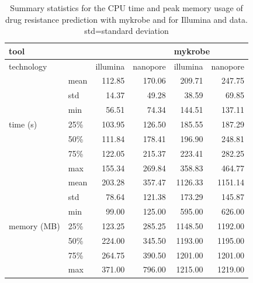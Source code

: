 \begin{table}
\centering
\begin{tabular}{|l|l|r|r|r|r|}
\hline
\multicolumn{2}{|l|}{tool}       & \multicolumn{2}{l|}{\drprg{}} & \multicolumn{2}{l|}{mykrobe} \\ \hline
\multicolumn{2}{|l|}{technology} & illumina     & nanopore    & illumina      & nanopore     \\ \hline
\multirow{7}{*}{time (s)}    & mean  & 112.85       & 170.06      & 209.71        & 247.75       \\ \cline{2-6} 
                         & std   & 14.37        & 49.28       & 38.59         & 69.85        \\ \cline{2-6} 
                         & min   & 56.51        & 74.34       & 144.51        & 137.11       \\ \cline{2-6} 
                         & 25\%  & 103.95       & 126.50      & 185.55        & 187.29       \\ \cline{2-6} 
                         & 50\%  & 111.84       & 178.41      & 196.90        & 248.81       \\ \cline{2-6} 
                         & 75\%  & 122.05       & 215.37      & 223.41        & 282.25       \\ \cline{2-6} 
                         & max   & 155.34       & 269.84      & 358.83        & 464.77       \\ \hline
\multirow{7}{*}{memory (MB)}  & mean  & 203.28       & 357.47      & 1126.33       & 1151.14      \\ \cline{2-6} 
                         & std   & 78.64        & 121.38      & 173.29        & 145.87       \\ \cline{2-6} 
                         & min   & 99.00        & 125.00      & 595.00        & 626.00       \\ \cline{2-6} 
                         & 25\%  & 123.25       & 285.25      & 1148.50       & 1192.00      \\ \cline{2-6} 
                         & 50\%  & 224.00       & 345.50      & 1193.00       & 1195.00      \\ \cline{2-6} 
                         & 75\%  & 264.75       & 390.50      & 1201.00       & 1201.00      \\ \cline{2-6} 
                         & max   & 371.00       & 796.00      & 1215.00       & 1219.00      \\ \hline
\end{tabular}
\caption{Summary statistics for the CPU time and peak memory usage of drug resistance prediction with mykrobe and \drprg{} for Illumina and \ont{} data. std=standard deviation}
\label{tab:predict-comp-pref}
\end{table}

